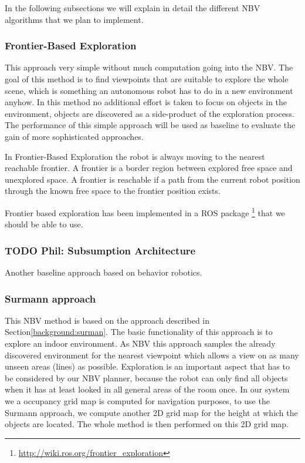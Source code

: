 \documentclass[a4paper,11pt,english]{article}
\begin{document}
In the following subsections we will explain in detail the different NBV algorithms that we plan to implement.

\subsubsection{Frontier-Based Exploration}
This approach very simple without much computation going into the NBV.
The goal of this method is to find viewpoints that are suitable to explore the whole scene, which is something an autonomous robot has to do in a new environment anyhow.
In this method no additional effort is taken to focus on objects in the environment, objects are discovered as a side-product of the exploration process.
The performance of this simple approach will be used as baseline to evaluate the gain of more sophisticated approaches.

In Frontier-Based Exploration the robot is always moving to the nearest reachable frontier.
A frontier is a border region between explored free space and unexplored space.
A frontier is reachable if a path from the current robot position through the known free space to the frontier position exists.

Frontier based exploration has been implemented in a ROS package \footnote{\url{http://wiki.ros.org/frontier_exploration}} that we should be able to use.

\subsubsection{TODO Phil: Subsumption Architecture}
Another baseline approach based on behavior robotics.

\subsubsection{Surmann approach}
This NBV method is based on the approach described in Section\ref{background:surman}.
The basic functionality of this approach is to explore an indoor environment.
As NBV this approach samples the already discovered environment for the nearest viewpoint which allows a view on as many unseen areas (lines) as possible.
Exploration is an important aspect that has to be considered by our NBV planner, because the robot can only find all objects when it has at least looked in all general areas of the room once.
In our system we a occupancy grid map is computed for navigation purposes, to use the Surmann approach, we compute another 2D grid map for the height at which the objects are located.
The whole method is then performed on this 2D grid map.
\end{document}
